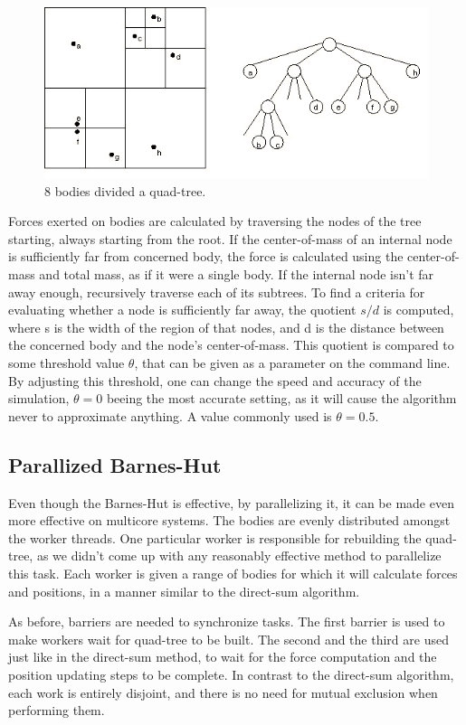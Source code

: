 \documentclass[10pt,a4paper]{article}
\begin{document}
\begin{figure}[h!]
\centering \includegraphics[scale=0.5]{images/bhtree}
\caption{8 bodies divided a quad-tree\cite{princeton}.}
\end{figure}

Forces exerted on bodies are calculated by traversing the nodes of the tree starting, always starting from the root. If the center-of-mass of an internal node is sufficiently far from concerned body, the force is calculated using the center-of-mass and total mass, as if it were a single body. If the internal node isn't far away enough, recursively traverse each of its subtrees. To find a criteria for evaluating whether a node is sufficiently far away, the quotient $s/d$ is computed, where s is the width of the region of that nodes, and d is the distance between the concerned body and the node's center-of-mass. This quotient is compared to some threshold value $\theta$, that can be given as a parameter on the command line. By adjusting this threshold, one can change the speed and accuracy of the simulation, $\theta = 0$ beeing the most accurate setting, as it will cause the algorithm never to approximate anything. A value commonly used is $\theta = 0.5$\cite{princeton}. 

\subsection{Parallized Barnes-Hut}
Even though the Barnes-Hut is effective, by parallelizing it, it can be made even more effective on multicore systems. The bodies are evenly distributed amongst the worker threads. One particular worker is responsible for rebuilding the quad-tree, as we didn't come up with any reasonably effective method to parallelize this task. Each worker is given a range of bodies for which it will calculate forces and positions, in a manner similar to the direct-sum algorithm.

As before, barriers  are needed to synchronize tasks. The first barrier is used to make workers wait for quad-tree to be built. The second and the third are used just like in the direct-sum method, to wait for the force computation and the position updating steps to be complete. In contrast to the direct-sum algorithm, each work is entirely disjoint, and there is no need for mutual exclusion when performing them.
\end{document}
